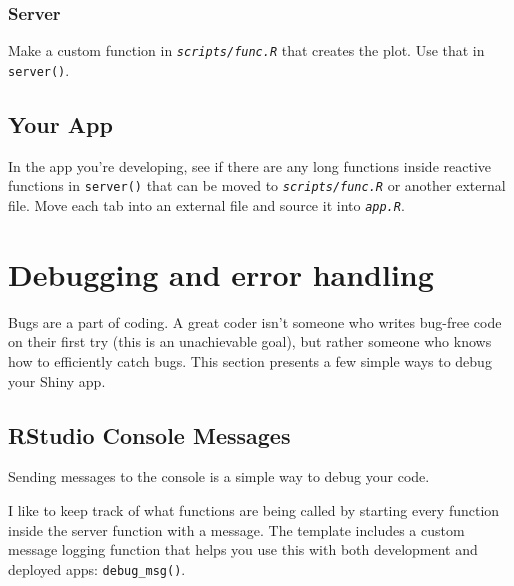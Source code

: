 \documentclass[
  oneside]{book}
\begin{document}
\hypertarget{server}{%
\subsection*{Server}\label{server}}

Make a custom function in \textit{\texttt{scripts/func.R}} that creates the plot. Use that in \texttt{server}\texttt{()}.

\hypertarget{your-app-structure}{%
\section{Your App}\label{your-app-structure}}

In the app you're developing, see if there are any long functions inside reactive functions in \texttt{server}\texttt{()} that can be moved to \textit{\texttt{scripts/func.R}} or another external file. Move each tab into an external file and source it into \textit{\texttt{app.R}}.

\hypertarget{debugging}{%
\chapter{Debugging and error handling}\label{debugging}}

Bugs are a part of coding. A great coder isn't someone who writes bug-free code on their first try (this is an unachievable goal), but rather someone who knows how to efficiently catch bugs. This section presents a few simple ways to debug your Shiny app.

\hypertarget{rstudio-console-messages}{%
\section{RStudio Console Messages}\label{rstudio-console-messages}}

Sending messages to the console is a simple way to debug your code.

I like to keep track of what functions are being called by starting every function inside the server function with a message. The template includes a custom message logging function that helps you use this with both development and deployed apps: \texttt{debug\_msg}\texttt{()}.
\end{document}

